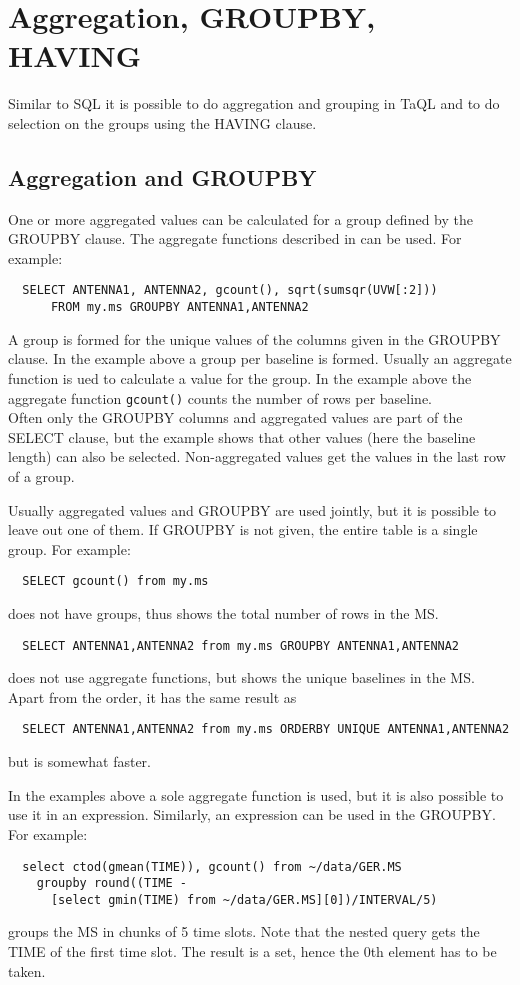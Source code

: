 \section{\label{TAQL:AGGREGATION}Aggregation, GROUPBY, HAVING}
Similar to SQL it is possible to do aggregation and grouping in TaQL
and to do selection on the groups using the HAVING clause.

\subsection{Aggregation and GROUPBY}
One or more aggregated values
can be calculated for a group defined by the GROUPBY clause.
The aggregate functions described in 
 can be used.
For example:
\begin{verbatim}
  SELECT ANTENNA1, ANTENNA2, gcount(), sqrt(sumsqr(UVW[:2]))
      FROM my.ms GROUPBY ANTENNA1,ANTENNA2
\end{verbatim}
A group is formed for the unique values of the columns given in the GROUPBY
clause. In the example above a group per baseline is formed. Usually an
aggregate function is ued to calculate a value for the group. In the
example above the aggregate function 
\texttt{gcount()} counts the number of rows per baseline.
\\Often only the GROUPBY columns and aggregated values are part of the
SELECT clause, but the example shows that other values (here the
baseline length) can also be selected. Non-aggregated values get the
values in the last row of a group. 

Usually aggregated values and GROUPBY are used jointly, but it is
possible to leave out one of them. If GROUPBY is not given, the entire
table is a single group. For example: 
\begin{verbatim}
  SELECT gcount() from my.ms
\end{verbatim}
does not have groups, thus shows the total number of rows in the MS.
\begin{verbatim}
  SELECT ANTENNA1,ANTENNA2 from my.ms GROUPBY ANTENNA1,ANTENNA2
\end{verbatim}
does not use aggregate functions, but shows the unique baselines in
the MS. Apart from the order, it has the same result as
\begin{verbatim}
  SELECT ANTENNA1,ANTENNA2 from my.ms ORDERBY UNIQUE ANTENNA1,ANTENNA2
\end{verbatim}
but is somewhat faster.

In the examples above a sole aggregate function is used, but it is
also possible to use it in an expression. Similarly, an expression can
be used in the GROUPBY. For example:
\begin{verbatim}
  select ctod(gmean(TIME)), gcount() from ~/data/GER.MS
    groupby round((TIME -
      [select gmin(TIME) from ~/data/GER.MS][0])/INTERVAL/5)
\end{verbatim}
groups the MS in chunks of 5 time slots. Note that the nested query
gets the TIME of the first time slot. The result is a set, hence the 0th element
has to be taken.

